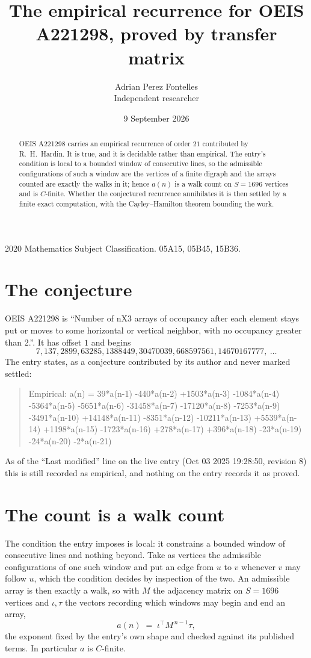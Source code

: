 \documentclass[11pt,a4paper]{article}
\title{The empirical recurrence for OEIS A221298, proved by transfer matrix}
\author{Adrian Perez Fontelles\\ \small Independent researcher}
\date{9 September 2026}
\theoremstyle{plain}
\theoremstyle{definition}
\begin{document}
\maketitle

\begin{abstract}
OEIS A221298 carries an empirical recurrence of order $21$ contributed by R.~H.~Hardin. It is
true, and it is decidable rather than empirical. The entry's condition is local to a bounded window of consecutive lines, so
the admissible configurations of such a window are the vertices of a finite digraph and the
arrays counted are exactly the walks in it; hence $a(n)$ is a walk count on $S=1696$ vertices
and is $C$-finite. Whether the conjectured recurrence annihilates it is then settled by a
finite exact computation, with the Cayley--Hamilton theorem bounding the work.
\end{abstract}

\noindent\small 2020 Mathematics Subject Classification. 05A15, 05B45, 15B36.\normalsize

\section{The conjecture}

OEIS A221298 is ``Number of nX3 arrays of occupancy after each element stays put or moves to some horizontal or vertical neighbor, with no occupancy greater than 2.''. It has offset $1$ and begins
\[
7, 137, 2899, 63285, 1388449, 30470039, 668597561, 14670167777,\ \dots
\]
The entry states, as a conjecture contributed by its author and never marked settled:
\begin{quote}
Empirical: a(n) = 39*a(n-1) -440*a(n-2) +1503*a(n-3) -1084*a(n-4) -5364*a(n-5) -5651*a(n-6) -31458*a(n-7) -17120*a(n-8) -7253*a(n-9) -3491*a(n-10) +14148*a(n-11) -8351*a(n-12) -10211*a(n-13) +5539*a(n-14) +1198*a(n-15) -1723*a(n-16) +278*a(n-17) +396*a(n-18) -23*a(n-19) -24*a(n-20) -2*a(n-21)
\end{quote}
As of the ``Last modified'' line on the live entry (Oct 03 2025 19:28:50, revision 8) this is still
recorded as empirical, and nothing on the entry records it as proved.

\section{The count is a walk count}

The condition the entry imposes is local: it constrains a bounded window of consecutive lines and nothing beyond. Take as
vertices the admissible configurations of one such window and put an edge from $u$ to $v$
whenever $v$ may follow $u$, which the condition decides by inspection of the two. An
admissible array is then exactly a walk, so with $M$ the adjacency matrix on $S=1696$ vertices
and $\iota,\tau$ the vectors recording which windows may begin and end an array,
\[
a(n)\;=\;\iota^{\!\top}M^{\,n-1}\tau ,
\]
the exponent fixed by the entry's own shape and checked against its published terms. In
particular $a$ is $C$-finite.
\end{document}
